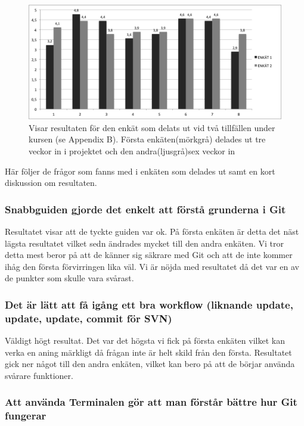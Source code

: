 \begin{figure}[htb!]\centering\includegraphics[width=1.0\textwidth]{EnkatResultat.png}\caption{Visar resultaten för den enkät som delats ut vid två tillfällen under kursen (se Appendix B). Första enkäten(mörkgrå) delades ut tre veckor in i projektet och den andra(ljusgrå)sex veckor in}\label{fig:enkat}\end{figure}

Här följer de frågor som fanns med i enkäten som delades ut samt en kort diskussion om resultaten.

\subsubsection{Snabbguiden gjorde det enkelt att förstå grunderna i Git}

Resultatet visar att de tyckte guiden var ok. På första enkäten är detta det näst lägsta resultatet vilket sedn ändrades mycket till den andra enkäten. Vi tror detta mest beror på att de känner sig säkrare med Git och att de inte kommer ihåg den första förvirringen lika väl. Vi är nöjda med resultatet då det var en av de punkter som skulle vara svårast.

\subsubsection{Det är lätt att få igång ett bra workflow (liknande update, update, update, commit för SVN)}

Väldigt högt resultat. Det var det högsta vi fick på första enkäten vilket kan verka en aning märkligt då frågan inte är helt skild från den första. Resultatet gick ner något till den andra enkäten, vilket kan bero på att de börjar använda svårare funktioner. 

\subsubsection{Att använda Terminalen gör att man förstår bättre hur Git fungerar}

